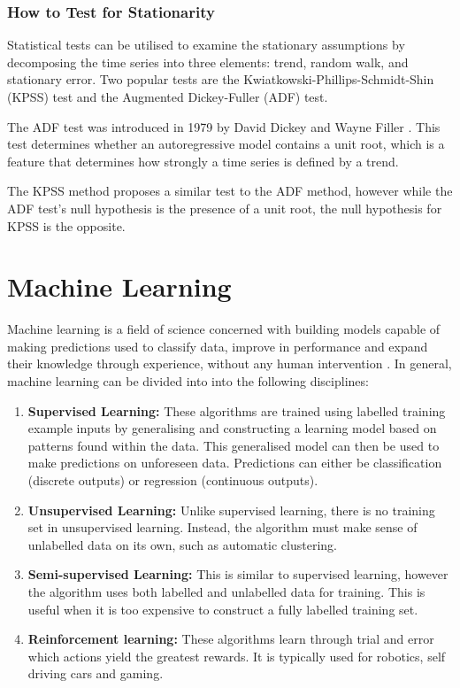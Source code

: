 \documentclass{UoYCSproject}
\begin{document}
\subsubsection{How to Test for Stationarity}
\label{subsec:testingstationarity}
Statistical tests can be utilised to examine the stationary assumptions by decomposing the time series into three elements: trend, random walk, and stationary error. Two popular tests are the Kwiatkowski-Phillips-Schmidt-Shin (KPSS) test and the Augmented Dickey-Fuller (ADF) test.

The ADF test was introduced in 1979 by David Dickey and Wayne Filler \cite{dickey1979distribution}. This test determines whether an autoregressive model contains a unit root, which is a feature that determines how strongly a time series is defined by a trend.

The KPSS method proposes a similar test to the ADF method, however while the ADF test's null hypothesis is the presence of a unit root, the null hypothesis for KPSS is the opposite. 

\section{Machine Learning}
Machine learning is a field of science concerned with building models capable of making predictions used to classify data, improve in performance and expand their knowledge through experience, without any human intervention \cite{mitchell1997}. 
In general, machine learning can be divided into into the following disciplines:

\begin{enumerate}
    \item \textbf{Supervised Learning:} These algorithms are trained using labelled training example inputs by generalising and constructing a learning model based on patterns found within the data. This generalised model can then be used to make predictions on unforeseen data. Predictions can either be classification (discrete outputs) or regression (continuous outputs). 
    
    \item \textbf{Unsupervised Learning:} Unlike supervised learning, there is no training set in unsupervised learning. Instead, the algorithm must make sense of unlabelled data on its own, such as automatic clustering.
    
    \item \textbf{Semi-supervised Learning:} This is similar to supervised learning, however the algorithm uses both labelled and unlabelled data for training. This is useful when it is too expensive to construct a fully labelled training set. 
    
    \item \textbf{Reinforcement learning:} These algorithms learn through trial and error which actions yield the greatest rewards. It is typically used for robotics, self driving cars and gaming.  
\end{enumerate}
\end{document}
